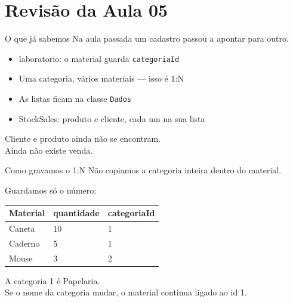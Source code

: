 \documentclass[aspectratio=169,11pt]{beamer}
\begin{document}
\section{Revisão da Aula 05}

\begin{frame}{O que já sabemos}
  Na aula passada um cadastro passou a apontar para outro.

  \vspace{0.5em}
  \begin{itemize}
    \item laboratorio: o material guarda \texttt{categoriaId}
    \item Uma categoria, vários materiais --- isso é 1{:}N
    \item As listas ficam na classe \texttt{Dados}
    \item StockSales: produto e cliente, cada um na sua lista
  \end{itemize}

  \vspace{0.5em}
  Cliente e produto ainda não se encontram.\\
  Ainda não existe venda.
\end{frame}

\begin{frame}{Como gravamos o 1{:}N}
  Não copiamos a categoria inteira dentro do material.

  \vspace{0.5em}
  Guardamos só o número:

  \vspace{0.4em}
  \begin{center}
  \begin{tabular}{lll}
    \toprule
    Material & quantidade & categoriaId \\
    \midrule
    Caneta & 10 & 1 \\
    Caderno & 5 & 1 \\
    Mouse & 3 & 2 \\
    \bottomrule
  \end{tabular}
  \end{center}

  \vspace{0.5em}
  A categoria 1 é Papelaria.\\
  Se o nome da categoria mudar, o material continua ligado ao id 1.
\end{frame}
\end{document}
